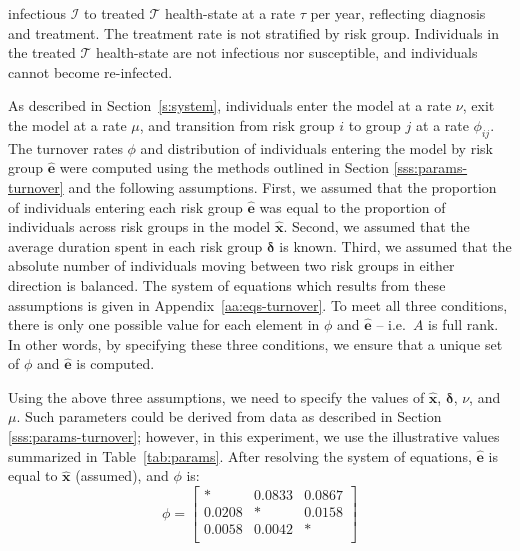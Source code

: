 infectious $\mathcal{I}$ to treated $\mathcal{T}$ health-state
at a rate $\tau$ per year, reflecting diagnosis and treatment.
The treatment rate is not stratified by risk group.
Individuals in the treated $\mathcal{T}$ health-state are not infectious nor susceptible,
and individuals cannot become re-infected.
\par
As described in Section~\ref{s:system}, individuals
enter the model at a rate $\nu$,
exit the model at a rate $\mu$,
and transition from risk group $i$ to group $j$ at a rate $\phi_{ij}$.
The turnover rates $\phi$ and
distribution of individuals entering the model by risk group $\bm{\hat{e}}$
were computed using the methods outlined in
Section \ref{sss:params-turnover}
and the following assumptions.
First, we assumed that
the proportion of individuals entering each risk group $\bm{\hat{e}}$
was equal to the proportion of individuals across risk groups in the model $\bm{\hat{x}}$.
Second, we assumed that
the average duration spent in each risk group $\bm{\delta}$ is known.
Third, we assumed that
the absolute number of individuals moving between two risk groups in either direction is balanced.
The system of equations which results from these assumptions
is given in Appendix~\ref{aa:eqs-turnover}.
To meet all three conditions, there is only one possible value
for each element in $\phi$ and $\bm{\hat{e}}$
-- i.e.\ $A$ is full rank.
In other words, by specifying these three conditions,
we ensure that a unique set of $\phi$ and $\bm{\hat{e}}$ is computed.
\par
Using the above three assumptions,
we need to specify the values of $\bm{\hat{x}}$, $\bm{\delta}$, $\nu$, and $\mu$.
Such parameters could be derived from data as described in Section \ref{sss:params-turnover};
however, in this experiment, we use the illustrative values summarized in
Table~\ref{tab:params}.
After resolving the system of equations,
$\bm{\hat{e}}$ is equal to $\bm{\hat{x}}$ (assumed), and $\phi$ is:
\begin{equation} %
\label{eq:phi-values}
\phi = \left[\begin{array}{ccc}
*      & 0.0833 & 0.0867 \\
0.0208 & *      & 0.0158 \\
0.0058 & 0.0042 & *      \\
\end{array}\right]
\end{equation}
